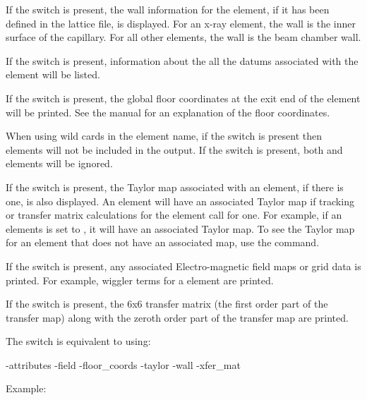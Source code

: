 {{{{{{{{If the  switch is present, the wall information for the element, if it has been defined in
the lattice file, is displayed. For an x-ray  element, the wall is the inner surface
of the capillary. For all other elements, the wall is the beam chamber wall.

If the  switch is present, information about the all the datums associated with the
element will be listed.

If the  switch is present, the global floor coordinates at the exit end of the
element will be printed. See the \bmad manual for an explanation of the floor coordinates.

When using wild cards in the element name, if the  switch is present then
 elements will not be included in the output. If the  switch is
present, both  and  elements will be ignored.

If the  switch is present, the Taylor map associated with an element, if there is one,
is also displayed. An element will have an associated Taylor map if tracking or transfer matrix
calculations for the element call for one. For example, if an elements  is set
to , it will have an associated Taylor map. To see the Taylor map for an element that
does not have an associated map, use the  command.

If the  switch is present, any associated Electro-magnetic field maps or grid data is
printed. For example, wiggler terms for a   element are printed.

If the  switch is present, the 6x6 transfer matrix (the first order part of the
transfer map) along with the zeroth order part of the transfer map are printed.

The  switch is equivalent to using:
\begin{example}
  -attributes
  -field
  -floor_coords
  -taylor
  -wall
  -xfer_mat
\end{example}

Example:

}}}}}}}}
